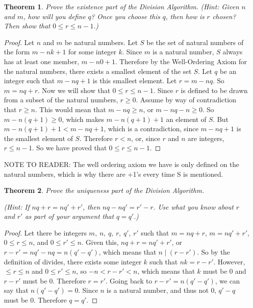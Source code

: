 \documentclass[12pt,leqno]{article}
\numberwithin{equation}{section}
\newtheorem{thm}{Theorem}[section]
\theoremstyle{definition}
\begin{document}
\begin{thm}
Prove the existence part of the Division Algorithm. (\textit{Hint}:
Given $n$ and $m$, how will you define $q$?  Once you choose this
$q$, then how is $r$ chosen?  Then show that $0 \leq r \leq n-1$.)
\end{thm}

\begin{proof}[Proof]
Let $n$ and $m$ be natural numbers.  Let $S$ be the set of natural numbers of the form $m-nk + 1$ for some integer $k$.  Since $m$ is a natural number, $S$ always has at least one member, $m-n0 + 1$.  Therefore by the Well-Ordering Axiom for the natural numbers, there exists a smallest element of the set $S$.  Let $q$ be an integer such that $m-nq + 1$ is this smallest element.  Let $r = m - nq$.  So $m = nq + r$.  Now we will show that $0 \leq r \leq n-1$.  Since $r$ is defined to be drawn from a  subset of the natural numbers, $r \geq 0$.  Assume by way of contradiction that $r \geq n$.  This would mean that $m - nq \geq n$, or $m - nq - n \geq 0$.  So $m - n(q+1) \geq 0$, which makes $m - n(q+1) + 1$ an element of $S$.  But $m - n(q+1) + 1 < m - nq + 1$, which is a contradiction, since $m - nq + 1$ is the smallest element of $S$.  Therefore $r < n$, or, since $r$ and $n$ are integers, $r \leq n-1$.  So we have proved that $0 \leq r \leq n-1$.
\end{proof}

NOTE TO READER: The well ordering axiom we have is only defined on the natural numbers, which is why there are +1's every time S is mentioned.

\begin{thm}
Prove the uniqueness part of the Division Algorithm.

(\textit{Hint}: If $nq + r = nq' + r'$, then $nq -nq' = r' - r$. Use
what you know about $r$ and $r'$ as part of your argument that $q =
q'$.)
\end{thm}

\begin{proof}[Proof]
Let there be integers $m,\ n,\ q,\ r,\ q',\ r'$ such that $m = nq +r$, $m = nq' + r'$, $0 \leq r \leq n$, and $0 \leq r' \leq n$.  Given this, $nq + r = nq' + r'$, or $r - r' = nq' - nq = n(q' - q')$, which means that $n \mid (r - r')$.  So by the definition of divides, there exists some integer $k$ such that $nk = r-r'$.  However, $\leq r \leq n$ and $0 \leq r' \leq n$, so $-n < r-r' < n$, which means that $k$ must be $0$ and $r-r'$ must be $0$.  Therefore $r = r'$.  Going back to  $r - r' = n(q' - q')$, we can say that $n(q' - q') = 0$.  Since $n$ is a natural number, and thus not $0$, $q' - q$ must be $0$.  Therefore $q = q'$.  
\end{proof}
\end{document}
